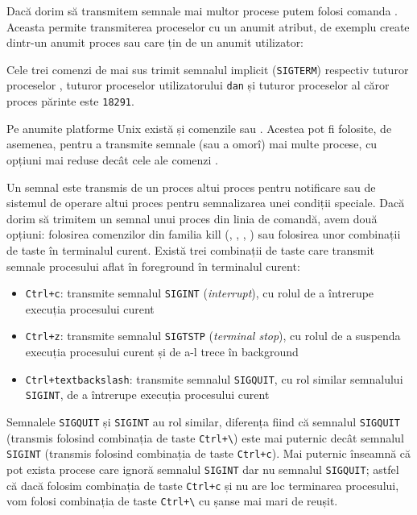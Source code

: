 Dacă dorim să transmitem semnale mai multor procese putem folosi comanda .
Aceasta permite transmiterea proceselor cu un anumit atribut, de exemplu create
dintr-un anumit proces sau care țin de un anumit utilizator:


Cele trei comenzi de mai sus trimit semnalul implicit (\texttt{SIGTERM}) respectiv tuturor proceselor , tuturor proceselor utilizatorului \texttt{dan} și tuturor proceselor al căror proces părinte este \texttt{18291}.

Pe anumite platforme Unix există și comenzile  sau . Acestea pot fi
folosite, de asemenea, pentru a transmite semnale (sau a omorî) mai multe
procese, cu opțiuni mai reduse decât cele ale comenzi .

Un semnal este transmis de un proces altui proces pentru notificare sau de
sistemul de operare altui proces pentru semnalizarea unei condiții speciale.
Dacă dorim să trimitem un semnal unui proces din linia de comandă, avem două
opțiuni: folosirea comenzilor din familia kill (, , , ) sau
folosirea unor combinații de taste în terminalul curent. Există trei combinații
de taste care transmit semnale procesului aflat în foreground în terminalul
curent:

\begin{itemize}
  \item \texttt{Ctrl+c}: transmite semnalul \texttt{SIGINT} (\textit{interrupt}), cu rolul de a
		întrerupe execuția procesului curent
  \item \texttt{Ctrl+z}: transmite semnalul \texttt{SIGTSTP} (\textit{terminal stop}), cu rolul de a suspenda execuția
		procesului curent și de a-l trece în background
  \item \texttt{Ctrl+textbackslash{}}: transmite semnalul \texttt{SIGQUIT}, cu rol similar
                semnalului \texttt{SIGINT}, de a întrerupe execuția procesului curent
\end{itemize}

Semnalele \texttt{SIGQUIT} și \texttt{SIGINT} au rol similar, diferența fiind că semnalul \texttt{SIGQUIT}
(transmis folosind combinația de taste \texttt{Ctrl+\textbackslash{}}) este mai puternic
decât semnalul \texttt{SIGINT} (transmis folosind combinația de taste \texttt{Ctrl+c}). Mai
puternic înseamnă că pot exista procese care ignoră semnalul \texttt{SIGINT} dar nu
semnalul \texttt{SIGQUIT}; astfel că dacă folosim combinația de taste \texttt{Ctrl+c} și nu are
loc terminarea procesului, vom folosi combinația de taste \texttt{Ctrl+\textbackslash{}}
cu șanse mai mari de reușit.

